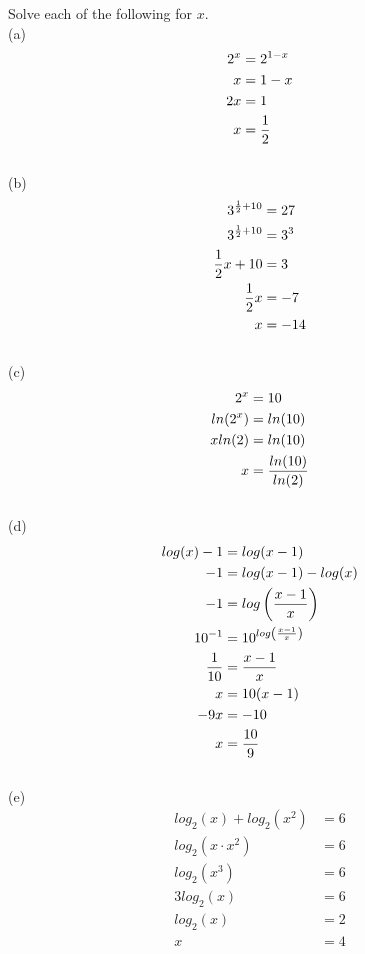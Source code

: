 \begin{exercise}\nonumber
	Solve each of the following for $ x $. \\

	(a)
	\begin{align}
		2^x & = 2^{1-x}     \\
		x   & = 1 - x       \\
		2x  & = 1           \\
		x   & = {1 \over 2}
	\end{align}
	\\

	(b)
	\begin{align}
		3^{{1 \over 2} + 10} & = 27   \\
		3^{{1 \over 2} + 10} & = 3^3  \\
		{1 \over 2}x + 10    & = 3    \\
		{1 \over 2}x         & = -7   \\
		x                    & = - 14
	\end{align}
	\\

	(c)
	\begin{align}
		2^x     & = 10                   \\
		ln(2^x) & = ln(10)               \\
		xln(2)  & = ln(10)               \\
		x       & = {ln(10) \over ln(2)}
	\end{align}
	\\

	(d)
	\begin{align}
		log(x) - 1   & = log(x - 1)                           \\
		-1           & = log(x - 1) - log(x)                  \\
		-1           & = log\left({x - 1 \over x}\right)      \\
		10^{-1}      & = 10^{log\left({x - 1 \over x}\right)} \\
		{1 \over 10} & = {x - 1 \over x}                      \\
		x            & = 10(x - 1)                            \\
		-9x          & = -10                                  \\
		x            & = {10 \over 9}
	\end{align}
	\\

	(e)
	\begin{align}
		log_2(x) + log_2(x^2) & = 6 \\
		log_2(x \cdot x^2)    & = 6 \\
		log_2(x^3)            & = 6 \\
		3log_2(x)             & = 6 \\
		log_2(x)              & = 2 \\
		x                     & = 4
	\end{align}
	\\


\end{exercise}
